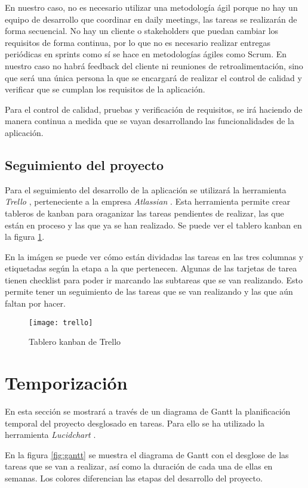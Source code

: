En nuestro caso, no es necesario utilizar una metodología ágil porque no hay un equipo de
desarrollo que coordinar en daily meetings, las tareas se realizarán de forma secuencial.
No hay un cliente o stakeholders que puedan cambiar los requisitos de forma
continua, por lo que no es necesario realizar entregas periódicas en sprints como
sí se hace en metodologías ágiles como Scrum. En nuestro caso no habrá feedback del
cliente ni reuniones de retroalimentación, sino que será una única persona la que
se encargará de realizar el control de calidad y verificar que se cumplan los
requisitos de la aplicación.

Para el control de calidad, pruebas y verificación de requisitos, se irá haciendo
de manera continua a medida que se vayan desarrollando las funcionalidades de la
aplicación.

\subsection{Seguimiento del proyecto}
Para el seguimiento del desarrollo de la aplicación se utilizará la herramienta
\textit{Trello} \cite{trello}, perteneciente a la empresa \textit{Atlassian} \cite{atlassian}.
Esta herramienta permite crear tableros de kanban para oraganizar
las tareas pendientes de realizar, las que están en proceso y las que ya se han
realizado. Se puede ver el tablero kanban en la figura \ref{fig:trello}.

En la imágen se puede ver cómo están dividadas las tareas en las tres columnas y
etiquetadas según la etapa a la que pertenecen. Algunas de las tarjetas de tarea
tienen checklist para poder ir marcando las subtareas que se van realizando. Esto
permite tener un seguimiento de las tareas que se van realizando y las que aún
faltan por hacer.

\begin{figure}[H]
  \centering
  \texttt{[image: trello]}
  \caption{Tablero kanban de Trello}
  \label{fig:trello}
\end{figure}


\section{Temporización}
En esta sección se mostrará a través de un diagrama de Gantt la planificación
temporal del proyecto desglosado en tareas. Para ello se ha utilizado la
herramienta \textit{Lucidchart} \cite{lucidchart}.

En la figura \ref{fig:gantt} se muestra el diagrama de Gantt con el desglose de las
tareas que se van a realizar, así como la duración de cada una de ellas en semanas.
Los colores diferencian las etapas del desarrollo del proyecto.

